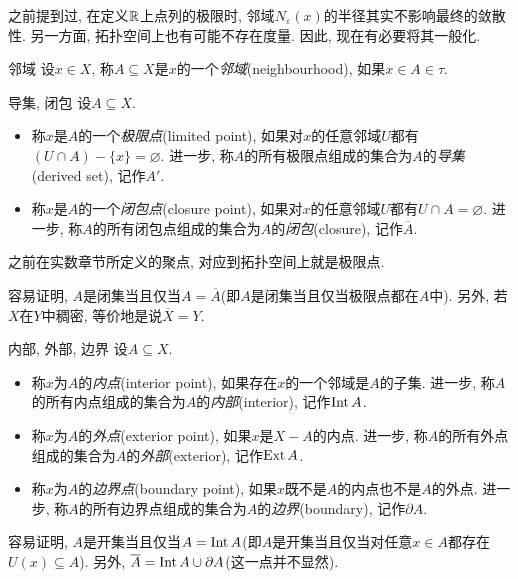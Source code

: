 之前提到过, 在定义$\mathbb{R}$上点列的极限时, 邻域$N_{\varepsilon}(x)$的半径其实不影响最终的敛散性. 另一方面, 拓扑空间上也有可能不存在度量. 因此, 现在有必要将其一般化. 

\begin{definition}{邻域}
	设$x \in X$, 称$A \subseteq X$是$x$的一个\textit{邻域}(neighbourhood), 如果$x \in A \in \tau$. 
\end{definition}

\begin{definition}{导集, 闭包}
	设$A \subseteq X$. 
	\begin{itemize}
		\item 称$x$是$A$的一个\textit{极限点}(limited point), 如果对$x$的任意邻域$U$都有$(U \cap A) - \{ x \} = \varnothing$. 进一步, 称$A$的所有极限点组成的集合为$A$的\textit{导集}(derived set), 记作$A'$. 
		\item 称$x$是$A$的一个\textit{闭包点}(closure point), 如果对$x$的任意邻域$U$都有$U \cap A = \varnothing$. 进一步, 称$A$的所有闭包点组成的集合为$A$的\textit{闭包}(closure), 记作$\overline{A}$. 
	\end{itemize}
\end{definition}
\begin{remark}
	之前在实数章节所定义的聚点, 对应到拓扑空间上就是极限点. 
\end{remark}

容易证明, $A$是闭集当且仅当$A=\overline{A}$(即$A$是闭集当且仅当极限点都在$A$中). 另外, 若$X$在$Y$中稠密, 等价地是说$\overline{X}=Y$. 

\begin{definition}{内部, 外部, 边界}
	设$A \subseteq X$. 
	\begin{itemize}
		\item 称$x$为$A$的\textit{内点}(interior point), 如果存在$x$的一个邻域是$A$的子集. 进一步, 称$A$的所有内点组成的集合为$A$的\textit{内部}(interior), 记作$\operatorname{Int} A$. 
		\item 称$x$为$A$的\textit{外点}(exterior point), 如果$x$是$X-A$的内点. 进一步, 称$A$的所有外点组成的集合为$A$的\textit{外部}(exterior), 记作$\operatorname{Ext} A$. 
		\item 称$x$为$A$的\textit{边界点}(boundary point), 如果$x$既不是$A$的内点也不是$A$的外点. 进一步, 称$A$的所有边界点组成的集合为$A$的\textit{边界}(boundary), 记作$\partial A$. 
	\end{itemize}
\end{definition}

容易证明, $A$是开集当且仅当$A= \operatorname{Int} A$(即$A$是开集当且仅当对任意$x \in A$都存在$U(x) \subseteq A$). 另外, $\overline{A} = \operatorname{Int} A \cup \partial A$(这一点并不显然). 



